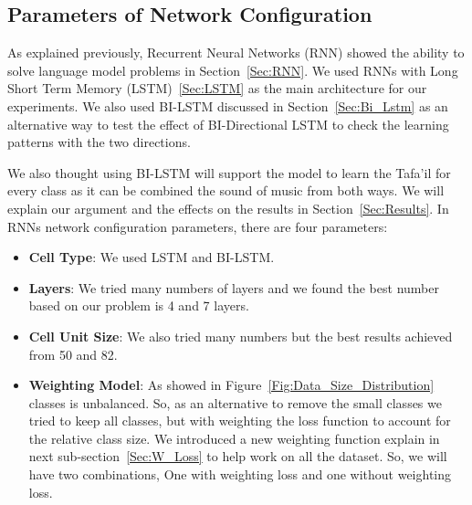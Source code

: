 %     
\subsection{Parameters of Network Configuration}\label{Sec:Rnn_Param}

As explained previously, Recurrent Neural Networks (RNN) showed the ability to solve language model problems in Section~\ref{Sec:RNN}. We used RNNs with Long Short Term Memory (LSTM)~\ref{Sec:LSTM} as the main architecture for our experiments. We also used BI-LSTM discussed in Section~\ref{Sec:Bi_Lstm} as an alternative way to test the effect of BI-Directional LSTM to check the learning patterns with the two directions.

We also thought using BI-LSTM will support the model to learn the Tafa'il for every class as it can be combined the sound of music from both ways. We will explain our argument and the effects on the results in Section~\ref{Sec:Results}.
In RNNs network configuration parameters, there are four parameters:
\begin{itemize}
  \item \textbf{Cell Type}: We used LSTM and BI-LSTM.
  \item \textbf{Layers}: We tried many numbers of layers and we found the best number based on our problem is 4 and 7 layers.
  \item \textbf{Cell Unit Size}: We also tried many numbers but the best results achieved from 50 and 82.
  \item \textbf{Weighting Model}: As showed in Figure~\ref{Fig:Data_Size_Distribution} classes is unbalanced. So, as an alternative to remove the small classes we tried to keep all classes, but with weighting the loss function to account for the relative class size. We introduced a new weighting function explain in next sub-section~\ref{Sec:W_Loss} to help work on all the dataset. So, we will have two combinations, One with weighting loss and one without weighting loss.
  
\end{itemize}

